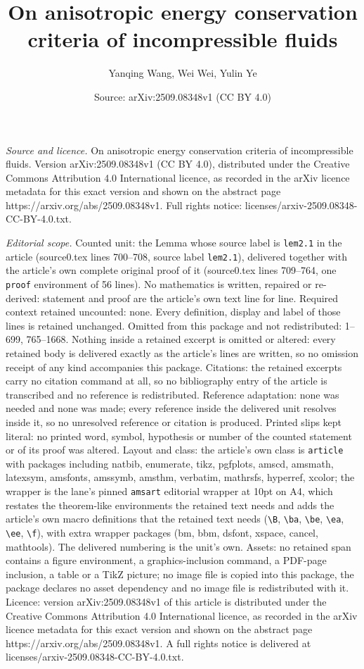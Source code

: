 \documentclass[10pt,a4paper]{amsart}
\title[On anisotropic energy conservation criteria of incompressibl]{On anisotropic energy conservation criteria of incompressible fluids}
\author{Yanqing Wang, Wei Wei, Yulin Ye}
\date{Source: arXiv:2509.08348v1 (CC BY 4.0)}
\begin{document}
\maketitle

\noindent\emph{Source and licence.} On anisotropic energy conservation criteria of incompressible fluids. Version arXiv:2509.08348v1 (CC BY 4.0), distributed under the Creative Commons Attribution 4.0 International licence, as recorded in the arXiv licence metadata for this exact version and shown on the abstract page https://arxiv.org/abs/2509.08348v1. Full rights notice: licenses/arxiv-2509.08348-CC-BY-4.0.txt.\par\smallskip

\noindent\textit{Editorial scope.} Counted unit: the Lemma whose source label is \texttt{lem2.1} in the article (source0.tex lines 700--708, source label \texttt{lem2.1}), delivered together with the article's own complete original proof of it (source0.tex lines 709--764, one \texttt{proof} environment of 56 lines). No mathematics is written, repaired or re-derived: statement and proof are the article's own text line for line. Required context retained uncounted: none. Every definition, display and label of those lines is retained unchanged. Omitted from this package and not redistributed: 1--699, 765--1668. Nothing inside a retained excerpt is omitted or altered: every retained body is delivered exactly as the article's lines are written, so no omission receipt of any kind accompanies this package. Citations: the retained excerpts carry no citation command at all, so no bibliography entry of the article is transcribed and no reference is redistributed. Reference adaptation: none was needed and none was made; every reference inside the delivered unit resolves inside it, so no unresolved reference or citation is produced. Printed slips kept literal: no printed word, symbol, hypothesis or number of the counted statement or of its proof was altered. Layout and class: the article's own class is \texttt{article} with packages including natbib, enumerate, tikz, pgfplots, amscd, amsmath, latexsym, amsfonts, amssymb, amsthm, verbatim, mathrsfs, hyperref, xcolor; the wrapper is the lane's pinned \texttt{amsart} editorial wrapper at 10pt on A4, which restates the theorem-like environments the retained text needs and adds the article's own macro definitions that the retained text needs (\texttt{\textbackslash B}, \texttt{\textbackslash ba}, \texttt{\textbackslash be}, \texttt{\textbackslash ea}, \texttt{\textbackslash ee}, \texttt{\textbackslash f}), with extra wrapper packages (bm, bbm, dsfont, xspace, cancel, mathtools). The delivered numbering is the unit's own. Assets: no retained span contains a figure environment, a graphics-inclusion command, a PDF-page inclusion, a table or a TikZ picture; no image file is copied into this package, the package declares no asset dependency and no image file is redistributed with it. Licence: version arXiv:2509.08348v1 of this article is distributed under the Creative Commons Attribution 4.0 International licence, as recorded in the arXiv licence metadata for this exact version and shown on the abstract page https://arxiv.org/abs/2509.08348v1. A full rights notice is delivered at licenses/arxiv-2509.08348-CC-BY-4.0.txt. 
\end{document}
